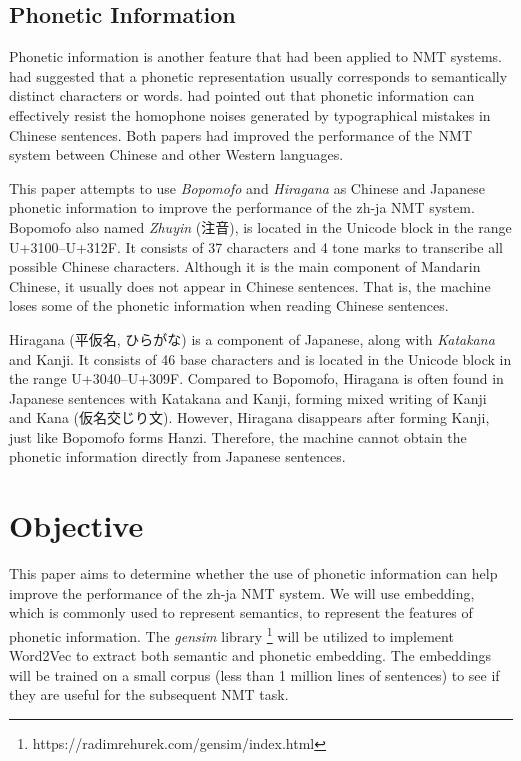 \subsection{Phonetic Information} \label{sec:phonetic}

Phonetic information is another feature that had been applied to NMT systems. \cite{khan2019diversity} had suggested that a phonetic representation usually corresponds to semantically distinct characters or words. \cite{liu-etal-2019-robust} had pointed out that phonetic information can effectively resist the homophone noises generated by typographical mistakes in Chinese sentences. Both papers had improved the performance of the NMT system between Chinese and other Western languages.

This paper attempts to use \textit{Bopomofo} and \textit{Hiragana} as Chinese and Japanese phonetic information to improve the performance of the zh-ja NMT system. Bopomofo also named \textit{Zhuyin} (注音), is located in the Unicode block in the range U+3100–U+312F. It consists of 37 characters and 4 tone marks to transcribe all possible Chinese characters. Although it is the main component of Mandarin Chinese, it usually does not appear in Chinese sentences. That is, the machine loses some of the phonetic information when reading Chinese sentences. \begin{CJK}{UTF8}{song}
Hiragana (平仮名, ひらがな) is a component of Japanese, along with \textit{Katakana} and Kanji. It consists of 46 base characters and is located in the Unicode block in the range U+3040–U+309F. Compared to Bopomofo, Hiragana is often found in Japanese sentences with Katakana and Kanji, forming mixed writing of Kanji and Kana (仮名交じり文). However, Hiragana disappears after forming Kanji, just like Bopomofo forms Hanzi. Therefore, the machine cannot obtain the phonetic information directly from Japanese sentences.
\end{CJK}


\section{Objective} \label{sec:objective}

This paper aims to determine whether the use of phonetic information can help improve the performance of the zh-ja NMT system. We will use embedding, which is commonly used to represent semantics, to represent the features of phonetic information. The \textit{gensim} library \footnote{https://radimrehurek.com/gensim/index.html} will be utilized to implement Word2Vec \cite{mikolov2013efficient} to extract both semantic and phonetic embedding. The embeddings will be trained on a small corpus (less than 1 million lines of sentences) to see if they are useful for the subsequent NMT task.


